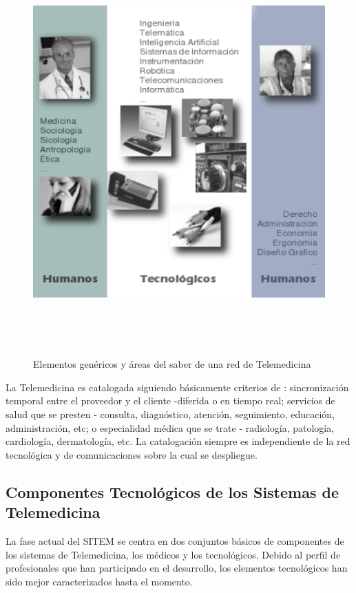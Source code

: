 \begin{figure}
 \centering
 \includegraphics[width=156mm, height=156mm]{sistema_telemedicina.png}
 \caption{Elementos genéricos y áreas del saber de una red de Telemedicina}
 \label{elementosred}
\end{figure}

La Telemedicina es catalogada siguiendo básicamente criterios de \cite{oas2002}: sincronización temporal entre el proveedor y el cliente -diferida o en tiempo real; servicios de salud que se presten \cite{aparicio2000} - consulta, diagnóstico, atención, seguimiento, educación, administración, etc;  o especialidad médica que se trate - radiología, patología, cardiología, dermatología, etc. La catalogación siempre es independiente de la red tecnológica y de comunicaciones sobre la cual se despliegue.

\subsection{Componentes Tecnológicos de los Sistemas de Telemedicina}
La fase actual del SITEM se centra en dos conjuntos básicos de componentes de los sistemas de Telemedicina, los médicos y los tecnológicos. Debido al perfil de profesionales que han participado en el desarrollo, los elementos tecnológicos han sido mejor caracterizados hasta el momento.

